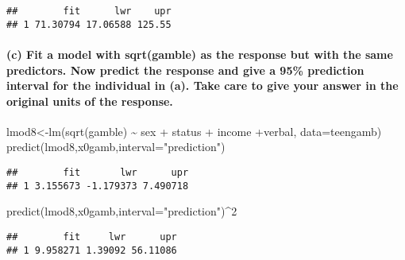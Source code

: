 \documentclass[
]{article}
\newenvironment{Shaded}{\begin{snugshade}}{\end{snugshade}}
\newcommand{\AttributeTok}[1]{\textcolor[rgb]{0.77,0.63,0.00}{#1}}
\newcommand{\DecValTok}[1]{\textcolor[rgb]{0.00,0.00,0.81}{#1}}
\newcommand{\FunctionTok}[1]{\textcolor[rgb]{0.00,0.00,0.00}{#1}}
\newcommand{\NormalTok}[1]{#1}
\newcommand{\OtherTok}[1]{\textcolor[rgb]{0.56,0.35,0.01}{#1}}
\newcommand{\SpecialCharTok}[1]{\textcolor[rgb]{0.00,0.00,0.00}{#1}}
\newcommand{\StringTok}[1]{\textcolor[rgb]{0.31,0.60,0.02}{#1}}
\begin{document}
\begin{verbatim}
##        fit      lwr    upr
## 1 71.30794 17.06588 125.55
\end{verbatim}

\hypertarget{c-fit-a-model-with-sqrtgamble-as-the-response-but-with-the-same-predictors.-now-predict-the-response-and-give-a-95-prediction-interval-for-the-individual-in-a.-take-care-to-give-your-answer-in-the-original-units-of-the-response.}{%
\paragraph{(c) Fit a model with sqrt(gamble) as the response but with
the same predictors. Now predict the response and give a 95\% prediction
interval for the individual in (a). Take care to give your answer in the
original units of the
response.}\label{c-fit-a-model-with-sqrtgamble-as-the-response-but-with-the-same-predictors.-now-predict-the-response-and-give-a-95-prediction-interval-for-the-individual-in-a.-take-care-to-give-your-answer-in-the-original-units-of-the-response.}}

\begin{Shaded}
\begin{Highlighting}[]
\NormalTok{lmod8}\OtherTok{\textless{}{-}}\FunctionTok{lm}\NormalTok{(}\FunctionTok{sqrt}\NormalTok{(gamble) }\SpecialCharTok{\textasciitilde{}}\NormalTok{ sex }\SpecialCharTok{+}\NormalTok{ status }\SpecialCharTok{+}\NormalTok{ income }\SpecialCharTok{+}\NormalTok{verbal, }\AttributeTok{data=}\NormalTok{teengamb)}
\FunctionTok{predict}\NormalTok{(lmod8,x0gamb,}\AttributeTok{interval=}\StringTok{"prediction"}\NormalTok{)}
\end{Highlighting}
\end{Shaded}

\begin{verbatim}
##        fit       lwr      upr
## 1 3.155673 -1.179373 7.490718
\end{verbatim}

\begin{Shaded}
\begin{Highlighting}[]
\FunctionTok{predict}\NormalTok{(lmod8,x0gamb,}\AttributeTok{interval=}\StringTok{"prediction"}\NormalTok{)}\SpecialCharTok{\^{}}\DecValTok{2}
\end{Highlighting}
\end{Shaded}

\begin{verbatim}
##        fit     lwr      upr
## 1 9.958271 1.39092 56.11086
\end{verbatim}
\end{document}
